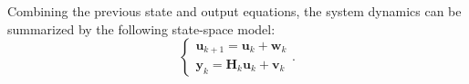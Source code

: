 \documentclass[5p,12pt]{elsarticle}
\begin{document}
Combining the previous state and output equations, the system dynamics can be summarized by the following state-space model:
\begin{equation}\label{eq:state_space}
	\begin{cases}
		\mathbf{u}_{k+1} = \mathbf{u}_k + \mathbf{w}_k\\
		\mathbf{y}_k = \mathbf{H}_k \mathbf{u}_k + \mathbf{v}_k
	\end{cases}.
\end{equation}



\end{document}

